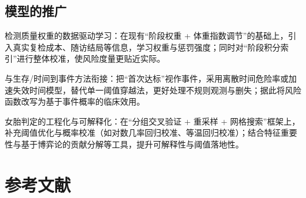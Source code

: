 \documentclass[utf8,12pt]{ctexart}
\begin{document}
\subsection{模型的推广}
\begin{compactitem}
    \item 检测质量权重的数据驱动学习：在现有“阶段权重 + 体重指数调节”的基础上，引入真实复检成本、随访结局等信息，学习权重与惩罚强度；同时对“阶段积分索引”进行整体校准，使风险度量更贴近实际。
    \item 与生存/时间到事件方法衔接：把“首次达标”视作事件，采用离散时间危险率或加速失效时间模型，替代单一阈值穿越法，更好处理不规则观测与删失；据此将风险函数改写为基于事件概率的临床效用。
    \item 女胎判定的工程化与可解释化：在“分组交叉验证 + 重采样 + 网格搜索”框架上，补充阈值优化与概率校准（如对数几率回归校准、等温回归校准）；结合特征重要性与基于博弈论的贡献分解等工具，提升可解释性与阈值落地性。
\end{compactitem}
\newpage

    {\centering\section*{参考文献}}
\end{document}
